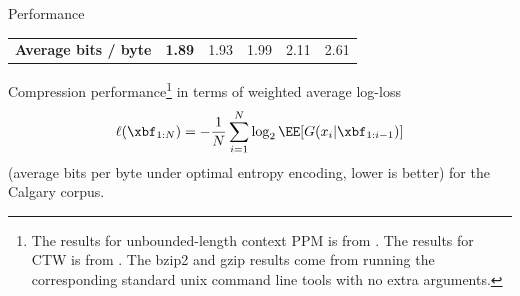 \documentclass[16pt]{beamer}
\begin{document}
\begin{frame}[t]{}
{\begin{block}{Performance}
\begin{table}[t]
\begin{center}
\begin{tabular}{l||r|c|c|c|c}
\textbf{Average bits / byte}      &{\bf 1.89}   & 1.93  &  1.99 & 2.11 & 2.61 \\%
\end{tabular}
\end{center}
\label{table:results}
\end{table}
\end{block}
Compression performance\footnote{The results for unbounded-length context PPM is from 
\cite{Cleary1997b}. The results for CTW is from \cite{Willems2009}.   The
bzip2 and gzip results come from running the corresponding standard unix
command line tools with no extra arguments.} in terms of weighted average log-loss
\[\ell(\xbf_{1:N}) = -\frac{1}{N}\sum_{i=1}^N \log_2 \EE[G(x_i|\xbf_{1:i-1})]\]
(average bits per byte under optimal entropy encoding, lower is better) for
the Calgary corpus.


}



\end{frame}
\end{document}
